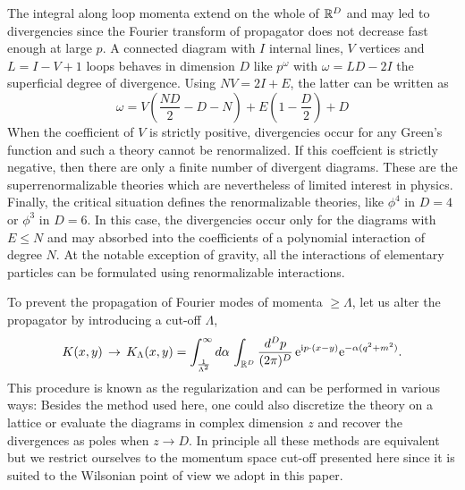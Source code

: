 \documentclass[10pt,here,feynmf]{article}
\begin{document}
The integral along loop momenta extend on the whole of ${{\Bbb R}^{D}}$ and may led to divergencies since the Fourier transform of propagator does not decrease fast enough at large $p$. A connected diagram with $I$ internal lines, $V$ vertices and $L=I-V+1$ loops behaves  in dimension $D$ like $p^{\omega}$ with $\omega=LD-2I$ the superficial degree of divergence. Using $NV=2I+E$, the latter can be written as 
\begin{equation}
\omega=V\left(\frac{ND}{2}-D-N\right)+E\left(1-\frac{D}{2}\right)+D
\end{equation}
When the coefficient of $V$ is strictly positive, divergencies occur for any Green's function and such a theory cannot be renormalized. If this coeffcient is strictly negative, then there are only a finite number of divergent diagrams. These are the superrenormalizable theories which are nevertheless of limited interest in physics. Finally, the critical situation defines the renormalizable theories, like $\phi^{4}$ in $D=4$ or $\phi^{3}$ in $D=6$. In this case, the divergencies occur only for the diagrams with $E\leq N$ and may absorbed into the coefficients of a polynomial  interaction of degree $N$. At the notable exception of gravity, all the interactions of elementary particles can be formulated using renormalizable interactions. 

To prevent the propagation of Fourier modes of momenta $\geq \Lambda$, let us alter the propagator by introducing a cut-off $\Lambda$,
\begin{equation} 
K(x,y)\,\rightarrow\,K_{\Lambda}(x,y)=\int_{\frac{1}{\Lambda^{2}}}^{\infty} d\alpha\,\int_{{\Bbb R}^{D}}\frac{d^{D}p}{(2\pi)^{D}}\,
\mathrm{e}^{\mathrm{i}p\cdot(x-y)}
\mathrm{e}^{-\alpha(q^{2}+m^{2})}
\label{propagator}.
\end{equation}
This procedure is known as the regularization and can be performed in various ways: Besides  the method used here, one could also discretize the theory on a lattice or evaluate the diagrams in complex dimension $z$ and recover the divergences as poles when $z\rightarrow D$. In principle all these methods are equivalent but we restrict ourselves to the momentum space  cut-off presented here since it is suited to the Wilsonian point of view we adopt in this paper.
\end{document}
